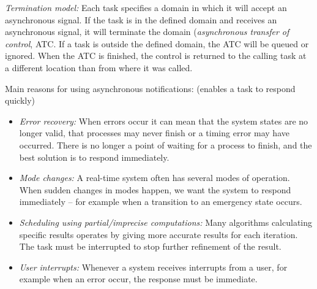 \textit{Termination model:} Each task specifies a domain in which it will accept an asynchronous signal. If the task is in the defined domain and receives an asynchronous signal, it will terminate the domain (\textit{asynchronous transfer of control}, ATC. If a task is outside the defined domain, the ATC will be queued or ignored. When the ATC is finished, the control is returned to the calling task at a different location than from where it was called.

Main reasons for using asynchronous notifications: (enables a task to respond quickly)
\begin{itemize}
  \item \textit{Error recovery:} When errors occur it can mean that the system states are no longer valid, that processes may never finish or a timing error may have occurred. There is no longer a point of waiting for a process to finish, and the best solution is to respond immediately.
  \item \textit{Mode changes:} A real-time system often has several modes of operation. When sudden changes in modes happen, we want the system to respond immediately -- for example when a transition to an emergency state occurs.
  \item \textit{Scheduling using partial/imprecise computations:} Many algorithms calculating specific results operates by giving more accurate results for each iteration. The task must be interrupted to stop further refinement of the result.
  \item \textit{User interrupts:} Whenever a system receives interrupts from a user, for example when an error occur, the response must be immediate.
\end{itemize}

